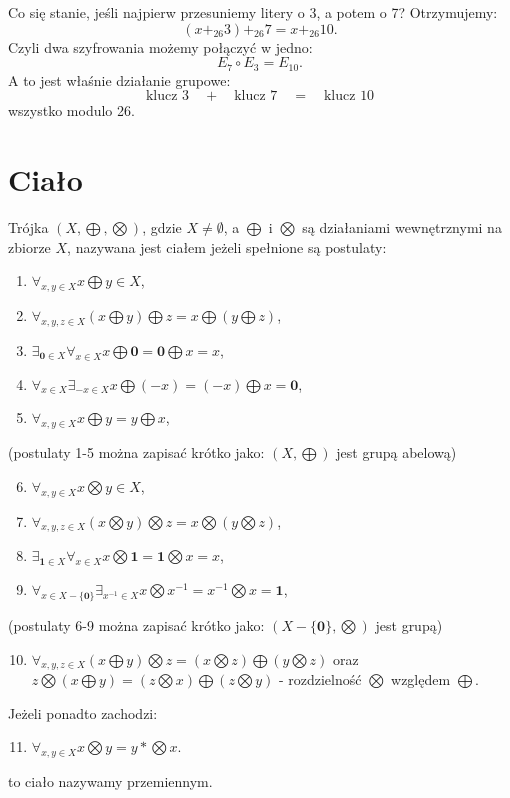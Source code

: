 \documentclass{article}
\begin{document}
Co się stanie, jeśli najpierw przesuniemy litery o 3, a potem o 7?
Otrzymujemy:
\[
    (x+_{26}3)+_{26}7=x+_{26}10.
\]
Czyli dwa szyfrowania możemy połączyć w jedno:
\[
    E_7\circ E_3=E_{10}.
\]
A to jest właśnie działanie grupowe:
\[
    \boxed{
    \text{klucz }3
    \quad+\quad
    \text{klucz }7
    \quad=\quad
    \text{klucz }10
}
\]
wszystko modulo 26.

\section{Ciało}
Trójka $(X, \bigoplus, \bigotimes)$, gdzie $X \neq \emptyset$, a $\bigoplus$ i $\bigotimes$ są działaniami wewnętrznymi na zbiorze $X$, nazywana jest ciałem jeżeli spełnione są postulaty:
\begin{enumerate}
    \item $\forall_{x,y \in X} x \bigoplus y \in X$,
    \item $\forall_{x, y, z \in X} (x \bigoplus y) \bigoplus z = x \bigoplus (y \bigoplus z)$,
    \item $\exists_{\textbf{0} \in X} \forall_{x \in X} x \bigoplus \textbf{0} = \textbf{0} \bigoplus x = x$,
    \item $\forall_{x \in X} \exists_{-x \in X} x \bigoplus (-x) = (-x) \bigoplus x = \textbf{0}$,
    \item $\forall_{x,y \in X} x \bigoplus y = y \bigoplus x$,
\end{enumerate}
(postulaty 1-5 można zapisać krótko jako: $(X, \bigoplus)$ jest grupą abelową)
\begin{enumerate}
    \setcounter{enumi}{5}
    \item $\forall_{x,y \in X} x \bigotimes y \in X$,
    \item $\forall_{x, y, z \in X} (x \bigotimes y) \bigotimes z = x \bigotimes (y \bigotimes z)$,
    \item $\exists_{\textbf{1} \in X} \forall_{x \in X} x \bigotimes \textbf{1} = \textbf{1} \bigotimes x = x$,
    \item $\forall_{x \in X-\{\textbf{0}\}} \exists_{x^{-1} \in X} x \bigotimes x^{-1} = x^{-1} \bigotimes x = \textbf{1}$,
\end{enumerate}
(postulaty 6-9 można zapisać krótko jako: $(X - \{\textbf{0}\}, \bigotimes)$ jest grupą)
\begin{enumerate}
    \setcounter{enumi}{9}
    \item $\forall_{x,y,z \in X} (x \bigoplus y) \bigotimes z = (x \bigotimes z) \bigoplus (y \bigotimes z)$ oraz $z \bigotimes (x \bigoplus y) = (z \bigotimes x) \bigoplus (z \bigotimes y)$ - rozdzielność $\bigotimes$ względem $\bigoplus$.
\end{enumerate}
Jeżeli ponadto zachodzi:
\begin{enumerate}
    \setcounter{enumi}{10}
    \item $\forall_{x,y \in X} x \bigotimes y = y *\bigotimes x$.
\end{enumerate}
to ciało nazywamy przemiennym.
\end{document}
